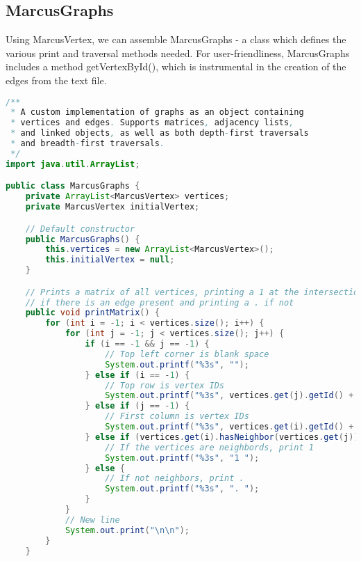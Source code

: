 \documentclass[letterpaper, 10pt]{article}
\begin{document}
\subsection{MarcusGraphs}

\hspace{1.0em}Using MarcusVertex, we can assemble MarcusGraphs - a class which defines the various print and traversal methods needed. For user-friendliness, MarcusGraphs includes a method getVertexById(), which is instrumental in the creation of the edges from the text file.

\vspace{6.0em}

\begin{lstlisting}[language=Java, firstnumber=1]
/**
 * A custom implementation of graphs as an object containing
 * vertices and edges. Supports matrices, adjacency lists,
 * and linked objects, as well as both depth-first traversals
 * and breadth-first traversals.
 */
import java.util.ArrayList;

public class MarcusGraphs {
    private ArrayList<MarcusVertex> vertices;
    private MarcusVertex initialVertex;

    // Default constructor
    public MarcusGraphs() {
        this.vertices = new ArrayList<MarcusVertex>();
        this.initialVertex = null;
    }

    // Prints a matrix of all vertices, printing a 1 at the intersection
    // if there is an edge present and printing a . if not
    public void printMatrix() {
        for (int i = -1; i < vertices.size(); i++) {
            for (int j = -1; j < vertices.size(); j++) {
                if (i == -1 && j == -1) {
                    // Top left corner is blank space
                    System.out.printf("%3s", "");
                } else if (i == -1) {
                    // Top row is vertex IDs
                    System.out.printf("%3s", vertices.get(j).getId() + " ");
                } else if (j == -1) {
                    // First column is vertex IDs
                    System.out.printf("%3s", vertices.get(i).getId() + " ");
                } else if (vertices.get(i).hasNeighbor(vertices.get(j))) {
                    // If the vertices are neighbords, print 1
                    System.out.printf("%3s", "1 ");
                } else {
                    // If not neighbors, print .
                    System.out.printf("%3s", ". ");
                }
            }
            // New line
            System.out.print("\n\n");
        }
    }


\end{lstlisting}
\end{document}
